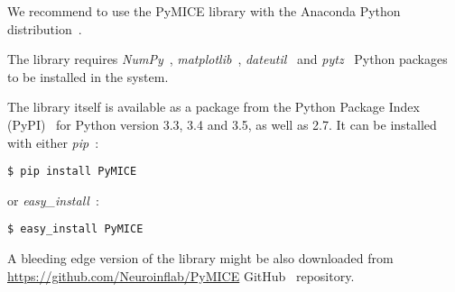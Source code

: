 We recommend to use the PyMICE library with the Anaconda Python distribution~\cite{anacondaSoftware}.

The library requires \emph{NumPy}~\cite{wald2011,Oliphant:2007ud},
\emph{matplotlib}~\cite{citeulike:2878517}, \emph{dateutil}~\cite{dateutil} and \emph{pytz}~\cite{pytz}
Python packages to be installed in the system.

\begin{samepage}
The library itself is available as a package from the Python Package Index (PyPI)~\cite{pep0301,pypi}
for Python version 3.3, 3.4 and 3.5, as well as 2.7.
It can be installed with either \emph{pip}~\cite{pip}:

\begin{verbatim}
$ pip install PyMICE
\end{verbatim}

or \emph{easy\_install}~\cite{setuptools}:

\begin{verbatim}
$ easy_install PyMICE
\end{verbatim}
\end{samepage}

A bleeding edge version of the library might be also downloaded from
\url{https://github.com/Neuroinflab/PyMICE} GitHub~\cite{github} repository.
